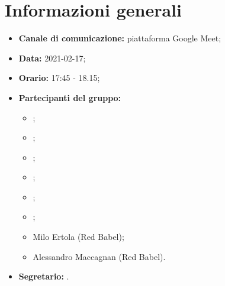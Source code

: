 \section{Informazioni generali}
\begin{itemize}
\item \textbf{Canale di comunicazione:} piattaforma Google Meet;
\item \textbf{Data:} 2021-02-17;
\item \textbf{Orario:} 17:45 - 18.15;
\item \textbf{Partecipanti del gruppo:}
	\begin{itemize}
	\item \MDI ;
	\item \MB ;
	\item \GB ;
	\item \VAS ;
	\item \FD ;
	\item \NM ;
	\item Milo Ertola (Red Babel);
	\item Alessandro Maccagnan (Red Babel).
	\end{itemize}
\item \textbf{Segretario:} \MB .

\end{itemize}